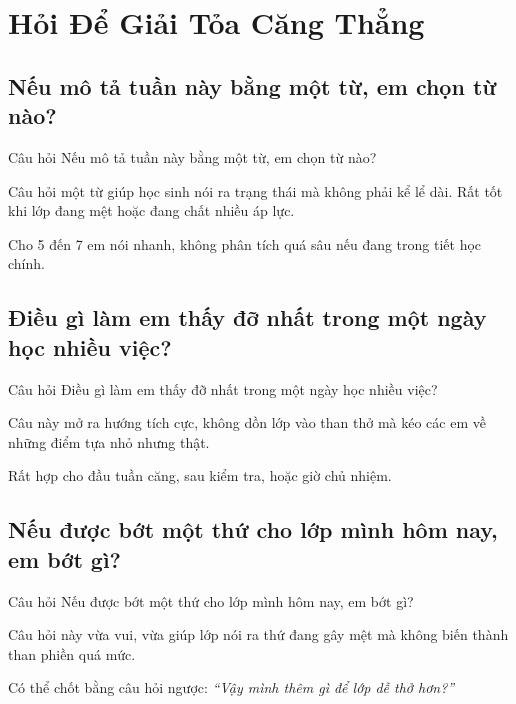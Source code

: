 \chapter{Hỏi Để Giải Tỏa Căng Thẳng}

\section{Nếu mô tả tuần này bằng một từ, em chọn từ nào?}
\begin{cauhoibox}{Câu hỏi}
Nếu mô tả tuần này bằng một từ, em chọn từ nào?
\end{cauhoibox}
\begin{taisaocoich}
Câu hỏi một từ giúp học sinh nói ra trạng thái mà không phải kể lể dài. Rất tốt khi lớp đang mệt hoặc đang chất nhiều áp lực.
\end{taisaocoich}
\begin{goiybien}
Cho 5 đến 7 em nói nhanh, không phân tích quá sâu nếu đang trong tiết học chính.
\end{goiybien}
\ngancach

\section{Điều gì làm em thấy đỡ nhất trong một ngày học nhiều việc?}
\begin{cauhoibox}{Câu hỏi}
Điều gì làm em thấy đỡ nhất trong một ngày học nhiều việc?
\end{cauhoibox}
\begin{taisaocoich}
Câu này mở ra hướng tích cực, không dồn lớp vào than thở mà kéo các em về những điểm tựa nhỏ nhưng thật.
\end{taisaocoich}
\begin{goiybien}
Rất hợp cho đầu tuần căng, sau kiểm tra, hoặc giờ chủ nhiệm.
\end{goiybien}
\ngancach

\section{Nếu được bớt một thứ cho lớp mình hôm nay, em bớt gì?}
\begin{cauhoibox}{Câu hỏi}
Nếu được bớt một thứ cho lớp mình hôm nay, em bớt gì?
\end{cauhoibox}
\begin{taisaocoich}
Câu hỏi này vừa vui, vừa giúp lớp nói ra thứ đang gây mệt mà không biến thành than phiền quá mức.
\end{taisaocoich}
\begin{goiybien}
Có thể chốt bằng câu hỏi ngược: \textit{``Vậy mình thêm gì để lớp dễ thở hơn?''}
\end{goiybien}
\ngancach

